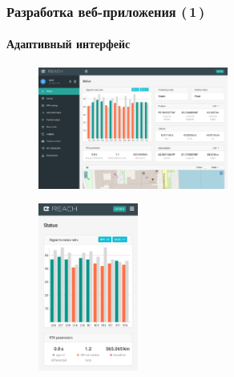 \documentclass[xetex,с,aspectratio=169]{beamer}
\begin{document}
%
%
\begin{frame}
  \frametitle{Разработка веб-приложения (\,1\,)}
  \framesubtitle{Адаптивный интерфейс}

  \begin{minipage}{\textwidth}
    \centering
    \begin{minipage}[c]{.5\textwidth}
      \centering
      \begin{figure}[c]
        \centering
        \includegraphics[height=4cm]{../img/reachview/homepage_responsive-lg}
      \end{figure}
    \end{minipage}
    \hspace{2em}
    \begin{minipage}[c]{.3\textwidth}
      \centering
      \begin{figure}[c]
        \centering
        \includegraphics[height=5.5cm]{../img/reachview/homepage_responsive-xs}
      \end{figure}
    \end{minipage}
  \end{minipage}
\end{frame}


\end{document}
